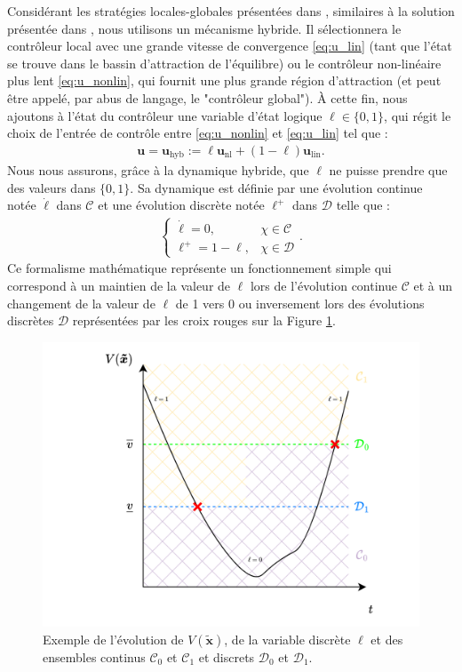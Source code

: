Considérant les stratégies locales-globales présentées dans \cite[Ex. 1. 7]{65}, similaires à la solution présentée dans \cite{AndreettoFZ16}, nous utilisons un mécanisme hybride. Il sélectionnera le contrôleur local avec une grande vitesse de convergence \eqref{eq:u_lin} (tant que l'état se trouve dans le bassin d'attraction de l'équilibre) ou le contrôleur non-linéaire plus lent \eqref{eq:u_nonlin}, qui fournit une plus grande région d'attraction (et peut être appelé, par abus de langage, le "contrôleur global"). À cette fin, nous ajoutons à l'état du contrôleur une variable d'état logique $\ell \in \{0,1\}$, qui régit le choix de l'entrée de contrôle entre \eqref{eq:u_nonlin} et \eqref{eq:u_lin} tel que :
\begin{align}
\label{eq:u_hybrid}
  \boldsymbol{u}=\boldsymbol{u}_{\text{hyb}} := \ell \boldsymbol{u}_{\text{nl}} + (1-\ell) \boldsymbol{u}_{\text{lin}}.
\end{align}
Nous nous assurons, grâce à la dynamique hybride, que $\ell$ ne puisse prendre que des valeurs dans $\{0,1\}$. Sa dynamique est définie par une évolution continue notée $\dot \ell$ dans $\mathcal{C}$ et une évolution discrète notée $\ell^{+}$ dans $\mathcal{D}$ telle que : 
\begin{align}
    \left\{
        \begin{array}{ll}
            \dot \ell = 0,& \chi \in \mathcal{C}\\
            \ell^{+} = 1-\ell,& \chi \in \mathcal{D}
        \end{array}.
    \right.
\end{align}
Ce formalisme mathématique représente un fonctionnement simple qui correspond à un maintien de la valeur de $\ell$ lors de l'évolution continue $\mathcal{C}$ et à un changement de la valeur de $\ell$ de 1 vers 0 ou inversement lors des évolutions discrètes $\mathcal{D}$ représentées par les croix rouges sur la Figure \ref{fig:ensembletrnaistion}.
\begin{figure}[ht!]
  \centering
  \includegraphics[trim=0cm 0cm 0cm 0cm,clip,width=0.8\columnwidth]{figures/transition.png}
  \caption{Exemple de l'évolution de $V(\boldsymbol{\tilde x})$, de la variable discrète $\ell$ et des ensembles continus $\mathcal{C}_{0}$ et $ \mathcal{C}_{1}$ et discrets $\mathcal{D}_{0}$ et $\mathcal{D}_{1}$.}
  \label{fig:ensembletrnaistion}
\end{figure}

